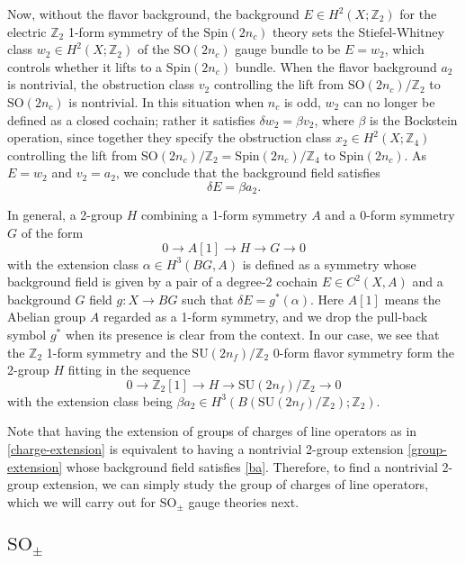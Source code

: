 \documentclass[12pt]{article}
\numberwithin{equation}{section}
\def\bZ{\mathbb{Z}}
\def\SU{\mathrm{SU}}
\def\SO{\mathrm{SO}}
\def\Spin{\mathrm{Spin}}
\begin{document}
Now, without the flavor background,  the background $E\in H^2(X;\bZ_2)$ for the electric $\bZ_2$ 1-form symmetry of the $\Spin(2n_c)$ theory sets the Stiefel-Whitney class $w_2\in H^2(X;\bZ_2)$ of the $\SO(2n_c)$ gauge bundle to be $E=w_2$, which controls whether it lifts to a $\Spin(2n_c)$ bundle.
When the flavor background $a_2$ is nontrivial,
the obstruction class $v_2$ controlling the lift from $\SO(2n_c)/\bZ_2$ to $\SO(2n_c)$ is nontrivial.
In this situation when $n_c$ is odd, $w_2$ can no longer be defined as a closed cochain; rather it satisfies $\delta w_2 = \beta v_2$, where $\beta$ is the Bockstein operation,
since together they specify the obstruction class $x_2\in H^2(X;\bZ_4)$ 
controlling the lift from $\SO(2n_c)/\bZ_2=\Spin(2n_c)/\bZ_4$ to $\Spin(2n_c)$.
As $E=w_2$ and $v_2=a_2$, we conclude that the background field satisfies \begin{equation}
\delta E=\beta a_2.
\label{ba}
\end{equation}

In general, a 2-group $H$ combining a 1-form symmetry $A$ and a 0-form symmetry $G$ of the form \begin{equation}
0\to A[1]\to H\to G\to 0
\end{equation} with the extension class $\alpha\in H^3(BG,A)$ is defined as a symmetry whose background field is given by a pair of a degree-2 cochain $E\in C^2(X,A)$ and a background $G$ field $g:X\to BG$ such that $\delta E = g^*(\alpha)$.
Here $A[1]$ means the Abelian group $A$ regarded as a 1-form symmetry,
and we drop the pull-back symbol $g^*$ when its presence is clear from the context.
In our case, we see that the $\bZ_2$ 1-form symmetry and the $\SU(2n_f)/\bZ_2$ 0-form flavor symmetry form the 2-group $H$ fitting in the sequence \begin{equation}
0\to \bZ_2[1]\to H \to \SU(2n_f)/\bZ_2 \to 0
\label{group-extension}
\end{equation} with the extension class being $\beta a_2 \in H^3(B(\SU(2n_f)/\bZ_2);\bZ_2)$.

Note that having the extension of groups of charges of line operators as in \eqref{charge-extension}
is equivalent to having a nontrivial 2-group extension \eqref{group-extension} 
whose background field satisfies \eqref{ba}.
Therefore, to find a nontrivial 2-group extension, we can simply study the group of charges of line operators,
which we will carry out for $\SO_\pm$ gauge theories next.

\subsection{$\SO_\pm$}
\end{document}
